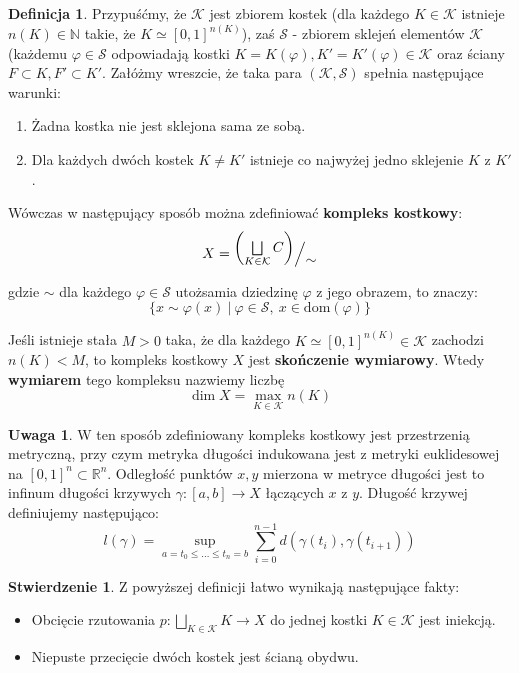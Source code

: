 \documentclass[licencjacka]{pracamgr}
\theoremstyle{definition}
\newtheorem{definition}{Definicja}[section]
\theoremstyle{definition}
\newtheorem{remark}{Uwaga}[section]
\theoremstyle{definition}
\newtheorem{proposition}{Stwierdzenie}[section]
\theoremstyle{definition}
\theoremstyle{definition}
\theoremstyle{plain}
\theoremstyle{plain}
\def\quotient#1#2{%
    \raise1ex\hbox{$#1$}\Big/\lower1ex\hbox{$#2$}%
}
\begin{document}
\begin{definition}
	Przypuśćmy, że $ \mathcal{K} $ jest zbiorem kostek (dla każdego $ K \in 
	\mathcal{K} $ istnieje $ n(K) \in \mathbb{N} $ takie, że $ K \simeq [0,1]^{n(K)} $), 
	zaś $ \mathcal{S} $ - zbiorem sklejeń elementów $ \mathcal{K} $ (każdemu 
	$ \varphi \in \mathcal{S} $ odpowiadają kostki $ K = K(\varphi), K' = 
	K'(\varphi) \in \mathcal{K} $ oraz ściany $ F \subset K, F' \subset K' $. Załóżmy 
	wreszcie, że taka para 	$ (\mathcal{K}, \mathcal{S})  $ spełnia następujące warunki:

	\begin{enumerate}
		\item Żadna kostka nie jest sklejona sama ze sobą.
		\item Dla każdych dwóch kostek $ K \neq K' $ istnieje co najwyżej jedno
		sklejenie $ K $ z $ K'$.
	\end{enumerate}

	Wówczas w następujący sposób można zdefiniować \textbf{kompleks kostkowy}:
	$$ X =  \quotient{\left( \bigsqcup\limits_{K \in \mathcal{K}} C \right)}{\sim} $$

	gdzie $ \sim $ dla każdego $ \varphi \in \mathcal{S} $ utożsamia dziedzinę $ \varphi $ 
	z jego obrazem, to znaczy: $$ \{ x \sim \varphi(x) ~ | ~ \varphi \in \mathcal{S}, ~ 
	x \in \text{dom}(\varphi) \} $$

	Jeśli istnieje stała $ M > 0 $ taka, że dla każdego $  K  \simeq [0,1]^{n(K)}\in 
	\mathcal{K} $ zachodzi $ n(K) < M $, to kompleks kostkowy $ X $ jest \textbf{skończenie 
	wymiarowy}. Wtedy \textbf{wymiarem} tego kompleksu nazwiemy liczbę 
	$$ \dim X = \max\limits_{K \in \mathcal{K}} n(K)$$
\end{definition}

\begin{remark}
	W ten sposób zdefiniowany kompleks kostkowy jest przestrzenią metryczną, przy czym 
	metryka długości indukowana jest z metryki euklidesowej 
	na $ [0,1]^n \subset \mathbb{R}^n$. Odległość punktów $ x,y $ mierzona w metryce 
	długości jest to infinum długości krzywych $ \gamma : [a,b] \rightarrow X $ 
	łączących $ x$ z $ y $. Długość krzywej definiujemy następująco: 
	$$ l(\gamma) = \sup\limits_{a = t_0 \leq \dots \leq t_n = b} \sum\limits_{i=0}^{n-1}
	d(\gamma(t_i), \gamma(t_{i+1})) $$
\end{remark}
\begin{proposition}
	Z powyższej definicji łatwo wynikają następujące fakty:
	\begin{itemize}
	\item Obcięcie rzutowania $ p : \bigsqcup_{K \in \mathcal{K}} K \rightarrow X$ do jednej 
	kostki $ K \in \mathcal{K}$ jest iniekcją.
	\item Niepuste przecięcie dwóch kostek jest ścianą obydwu.
	\end{itemize}	
\end{proposition}
\end{document}
